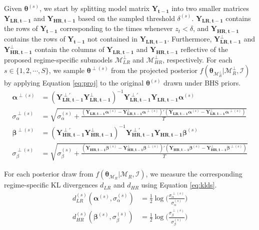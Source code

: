 Given $\bm{\theta}^{(s)}$, we start by splitting model matrix $\bm{Y_{t-1}}$ into two smaller matrices $\bm{Y_{LR,t-1}}$ and $\bm{Y_{HR,t-1}}$ based on the sampled threshold $\delta^{(s)}$. $\bm{Y_{LR,t-1}}$ contains the rows of $\bm{Y_{t-1}}$ corresponding to the times whenever $z_t<\delta$, and $\bm{Y_{HR,t-1}}$ contains the rows of  $\bm{Y_{t-1}}$ not contained in $\bm{Y_{LR,t-1}}$. Furthermore, $\bm{Y^{\perp}_{LR,t-1}}$ and $\bm{Y^{\perp}_{HR,t-1}}$ contain the columns of $\bm{Y_{LR,t-1}}$ and $\bm{Y_{HR,t-1}}$ reflective of the proposed regime-specific submodels $\mathcal{M}^\perp_{LR}$ and $\mathcal{M}^\perp_{HR}$, respectively. For each $s \in \{1,2,\cdots,S\}$, we sample $\bm{\theta}^{\perp(s)}$ from the  projected posterior $f(\bm{\theta}_{\mathcal{M}^\perp_R}|\mathcal{M}^\perp_R,\mathcal{I})$ by applying Equation \ref{eq:proj} to the original $\bm{\theta}^{(s)}$ drawn under BHS priors.
\begin{equation}
\label{eq:proj}
\begin{split}
\bm{\alpha}^{\perp(s)}&=(\bm{Y^{\perp'}_{LR,t-1}}\bm{Y^{\perp}_{LR,t-1}})^{-1} \bm{Y^{\perp'}_{LR,t-1}}     \bm{Y_{LR,t-1}}\bm{\alpha}^{(s)}\\
\sigma_\alpha^{\perp(s)}&=\sqrt{\sigma_\alpha^{(s)}+\frac{( \bm{Y_{LR,t-1}}\bm{\alpha}^{(s)}-\bm{Y^\perp_{LR,t-1}}\bm{\alpha}^{\perp(s)})'( \bm{Y_{LR,t-1}}\bm{\alpha}^{(s)}-\bm{Y^\perp_{LR,t-1}}\bm{\alpha}^{\perp(s)})}{T}                                  }\\
\bm{\beta}^{\perp(s)}&=(\bm{Y^{\perp'}_{HR,t-1}}\bm{Y^{\perp}_{HR,t-1}})^{-1} \bm{Y^{\perp'}_{HR,t-1}} \bm{Y_{HR,t-1}}\bm{\beta}^{(s)}\\
\sigma_\beta^{\perp(s)}&=\sqrt{\sigma_\beta^{(s)}+\frac{( \bm{Y_{HR,t-1}}\bm{\beta}^{(s)}-\bm{Y^\perp_{HR,t-1}}\bm{\beta}^{\perp(s)})'( \bm{Y_{HR,t-1}}\bm{\beta}^{(s)}-\bm{Y^\perp_{HR,t-1}}\bm{\beta}^{\perp(s)})}{T}                                   }
\end{split}
\end{equation}

For each posterior draw from $f(\bm{\theta}_{\mathcal{M}_R}|\mathcal{M}_{R},\mathcal{I})$, we measure the corresponding regime-specific KL divergences $d_{LR}$ and $d_{HR}$ using Equation \ref{eq:klds}.
\begin{equation}
\label{eq:klds}
\begin{split}
d^{(s)}_{LR}(\bm{\alpha}^{(s)},\sigma^{(s)}_\alpha)&=\frac{1}{2}\log\bigg(\frac{\sigma^{\perp(s)}_\alpha}{\sigma^{(s)}_\alpha}\bigg)\\
d^{(s)}_{HR}(\bm{\beta}^{(s)},\sigma^{(s)}_\beta)&=\frac{1}{2}\log\bigg(\frac{\sigma^{\perp(s)}_\beta}{\sigma^{(s)}_\beta}\bigg)
\end{split}
\end{equation}

